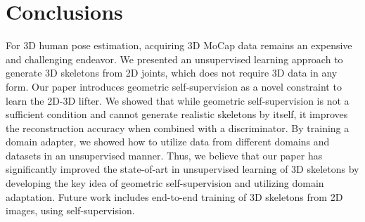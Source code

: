 \documentclass[10pt,twocolumn,letterpaper]{article}
\begin{document}
\section{Conclusions}
\label{sect:conclusions}


For 3D human pose estimation, acquiring 3D MoCap data remains an expensive and challenging endeavor. We presented an unsupervised learning approach to generate 3D skeletons from 2D joints, which does not require 3D data in any form. Our paper introduces geometric self-supervision as a novel constraint to learn the 2D-3D lifter. We showed that while geometric self-supervision is not a sufficient condition and cannot generate realistic skeletons by itself, it improves the reconstruction accuracy when combined with a discriminator. By training a domain adapter, we showed how to utilize data from different domains and datasets in an unsupervised manner. Thus, we believe that our paper has significantly improved the state-of-art in unsupervised learning of 3D skeletons by developing the key idea of geometric self-supervision and utilizing domain adaptation. Future work includes end-to-end training of 3D skeletons from 2D images, using self-supervision.














 

\clearpage



\end{document}
